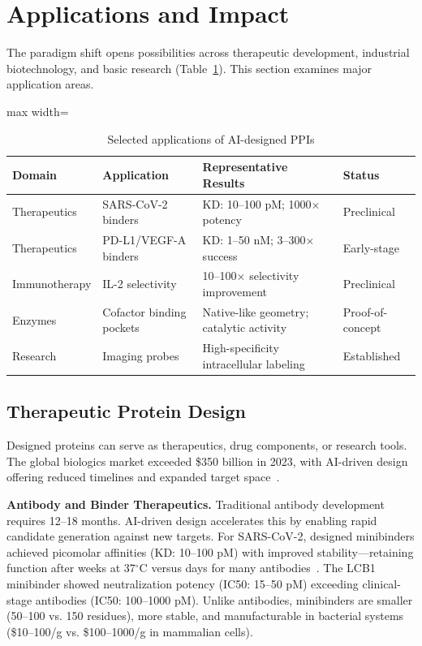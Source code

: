 \section{Applications and Impact}
\label{sec:applications}

The paradigm shift opens possibilities across therapeutic development, industrial biotechnology, and basic research (Table~\ref{tab:applications}). This section examines major application areas.

\begin{table}[h]
\centering
\caption{Selected applications of AI-designed PPIs}
\label{tab:applications}
\small
\begin{adjustbox}{max width=\textwidth}
\begin{tabular}{@{}llll@{}}
\toprule
\textbf{Domain} & \textbf{Application} & \textbf{Representative Results} & \textbf{Status} \\
\midrule
Therapeutics & SARS-CoV-2 binders & KD: 10--100 pM; 1000$\times$ potency~\cite{watson2023rfdiffusion} & Preclinical \\
Therapeutics & PD-L1/VEGF-A binders & KD: 1--50 nM; 3--300$\times$ success~\cite{zambaldi2024alphaproteo} & Early-stage \\
Immunotherapy & IL-2 selectivity & 10--100$\times$ selectivity improvement~\cite{fleming2021computational,silva2020il2} & Preclinical \\
Enzymes & Cofactor binding pockets & Native-like geometry; catalytic activity~\cite{krishna2024rfaa} & Proof-of-concept \\
Research & Imaging probes & High-specificity intracellular labeling~\cite{zhang2024nanobody} & Established \\
\bottomrule
\end{tabular}
\end{adjustbox}
\end{table}

\subsection{Therapeutic Protein Design}

Designed proteins can serve as therapeutics, drug components, or research tools. The global biologics market exceeded \$350 billion in 2023, with AI-driven design offering reduced timelines and expanded target space~\cite{trepte2024ai}.

\textbf{Antibody and Binder Therapeutics.} Traditional antibody development requires 12--18 months. AI-driven design accelerates this by enabling rapid candidate generation against new targets. For SARS-CoV-2, designed minibinders achieved picomolar affinities (KD: 10--100 pM) with improved stability---retaining function after weeks at 37$^\circ$C versus days for many antibodies~\cite{watson2023rfdiffusion}. The LCB1 minibinder showed neutralization potency (IC50: 15--50 pM) exceeding clinical-stage antibodies (IC50: 100--1000 pM). Unlike antibodies, minibinders are smaller (50--100 vs. 150 residues), more stable, and manufacturable in bacterial systems (\$10--100/g vs. \$100--1000/g in mammalian cells).

